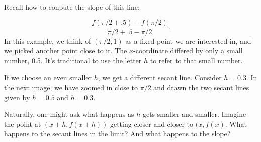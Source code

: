 \documentclass[11pt]{book}
\numberwithin{example}{chapter}
\begin{document}
Recall how to conpute the slope of this line:

$$\frac{f(\pi/2+.5) - f(\pi/2)}{\pi/2+.5 - \pi/2}.$$
In this example, we think of $(\pi/2,1)$ as a fixed point we are interested in, and we picked another point close to it.  The $x$-coordinate differed by only a small number, 0.5.  It's traditional to use the letter $h$ to refer to that small number.  

If we choose an even smaller $h$, we get a different secant line.  Consider $h=0.3$.  In the next image, we have zoomed in close to $\pi/2$ and drawn the two secant lines given by $h=0.5$ and $h=0.3$.  


\begin{center}
\end{center}

Naturally, one might ask what happens as $h$ gets smaller and smaller.  Imagine the point at $(x+h,f(x+h))$ getting closer and closer to $(x,f(x)$.  What happens to the secant lines in the limit?  And what happens to the slope?  
\end{document}
